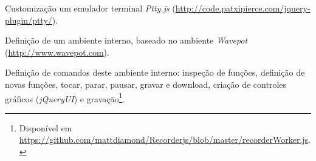 \begin{inparaenum}
\item Customização um emulador terminal \emph{Ptty.js} (\url{http://code.patxipierce.com/jquery-plugin/ptty/}).
\item Definição de um ambiente interno, baseado no ambiente \emph{Wavepot} (\url{http://www.wavepot.com}).
\item Definição de comandos deste ambiente interno: inspeção de funções, definição de novas funções, tocar, parar, pausar, gravar e download, criação de controles gráficos (\emph{jQueryUI}) e gravação\footnote{Disponível em \url{https://github.com/mattdiamond/Recorderjs/blob/master/recorderWorker.js}.}.
\end{inparaenum}

